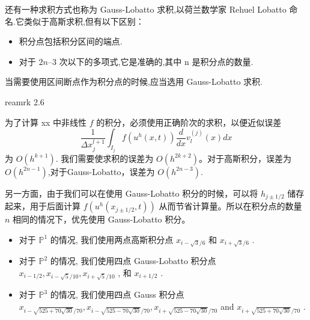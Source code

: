 \documentclass{book}
\begin{document}
\begin{example}
\begin{example}{}{}
\begin{example}
\begin{example}
\begin{example}
\begin{example}
\begin{example}{}{}
\begin{example}
还有一种求积方式也称为 Gauss-Lobatto 求积,以荷兰数学家 Rehuel Lobatto 命名.它类似于高斯求积,但有以下区别：
\begin{itemize}
    \item 积分点包括积分区间的端点.
    \item 对于 $2n – 3$ 次以下的多项式,它是准确的,其中 n 是积分点的数量.
\end{itemize}
当需要使用区间断点作为积分点的时候,应当选用 Gauss-Lobatto 求积.


\cite{RKDG2} reamrk 2.6


为了计算 xx 中非线性 $f$ 的积分，必须使用正确阶次的求积，以便近似误差
\begin{equation}
    \frac{1}{\Delta x_{j}^{l+1}} \int_{I_{j}} f\left(u^{h}(x, t)\right) \frac{d}{d x} v_{l}^{(j)}(x) d x
\end{equation}
为 $O\left(h^{k+1}\right)$. 我们需要使求积的误差为 $O\left(h^{2 k+2}\right)$。对于高斯积分，误差为 $O\left(h^{2n-1}\right)$,对于Gauss-Lobatto，误差为 $O\left(h^{2n-3}\right)$.

另一方面，由于我们可以在使用 Gauss-Lobatto 积分的时候，可以将 $h_{j \pm 1 / 2}$  储存起来，用于后面计算  $f\left(u^{h}\left(x_{j \pm 1 / 2}, t\right)\right)$ 从而节省计算量。所以在积分点的数量 $n$ 相同的情况下，优先使用  Gauss-Lobatto 积分。

\begin{itemize}
    \item 对于  $\mathbb{P}^{1}$  的情况, 我们使用两点高斯积分点  $x_{i-\sqrt{3} / 6}$  和  $x_{i+\sqrt{3} / 6}$ .
    \item 对于  $\mathbb{P}^{2}$  的情况, 我们使用四点 Gauss-Lobatto 积分点  $x_{i-1 / 2}, x_{i-\sqrt{5} / 10}, x_{i+\sqrt{5} / 10}$ , 和  $x_{i+1 / 2}$ .
    \item 对于  $\mathbb{P}^{3}$  的情况, 我们使用四点 Gauss 积分点  $x_{i-\sqrt{525+70 \sqrt{30}} / 70}, x_{i-\sqrt{525-70 \sqrt{30}} / 70}, x_{i+\sqrt{525-70 \sqrt{30}} / 70}$  and  $x_{i+\sqrt{525+70 \sqrt{30}} / 70}$ .
\end{itemize}


\end{example}
\end{example}
\end{example}
\end{example}
\end{example}
\end{example}
\end{example}
\end{example}
\end{document}

